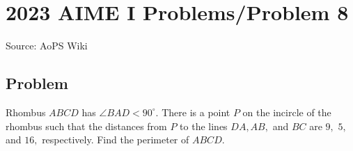 \documentclass[12pt]{article}
\begin{document}
\section*{{2023 AIME I Problems/Problem 8}}
Source: AoPS Wiki

\subsection*{Problem}
Rhombus $ABCD$ has $\angle BAD < 90^\circ.$ There is a point $P$ on the incircle of the rhombus such that the distances from $P$ to the lines $DA,AB,$ and $BC$ are $9,$ $5,$ and $16,$ respectively. Find the perimeter of $ABCD.$
\end{document}
